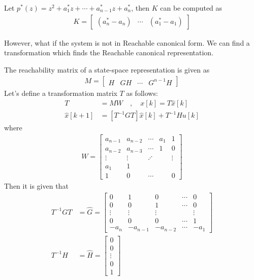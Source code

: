\documentclass[twoside]{article}
\begin{document}
%
Let $p^*(z) = z^2 + a_1^* z + \cdots + a_{n-1}^* z + a_n^*$, then $K$
can be computed as
%
\begin{align*}
  K = \left[ \begin{array}{ccc} (a^*_n - a_n) & \cdots & (a^*_1 - a_1) \end{array} \right]
\end{align*}

However, what if the system is not in Reachable canonical form. We can
find a transformation which finds the Reachable canonical
representation. 

The reachability matrix of a state-space representation is given as
%
\begin{align*}
  M = \left[ \begin{array}{c|c|c|c} H & G H & \cdots & G^{n-1} H\end{array} \right]
\end{align*}
%
Let's define a transformation matrix $T$ as follows:
%
\begin{align*}
  T &= M W \quad , \quad x[k] = T \hat{x}[k]
\\
 \hat{x}[k+1] &= \left[ T^{-1} G T \right] \hat{x}[k] + T^{-1} H u[k]
\end{align*}
%
where
%
\begin{align*}
  W = \left[ \begin{array}{ccccc} a_{n-1} & a_{n-2} & \cdots & a_1 & 1
               \\ 
a_{n-2} & a_{n-3} & \cdots & 1 & 0
\\ \vdots & \vdots & \iddots & & \vdots
\\ a_1 & 1 &  & & 
    \\ 1 & 0 & \cdots &  & 0 \end{array} \right] 
\end{align*}
%
Then it is given that
%
\begin{align*}
  T^{-1} G T &= \hat{G} =  \left[ \begin{array}{ccccc} 0 & 1 & 0 & \cdots & 0 \\ 0 & 0 & 1 &
                                                                      \cdots & 0
\\ \vdots & \vdots & \vdots & & \vdots
\\ 0 & 0 & 0 & \cdots & 1
    \\ -a_n & -a_{n-1} & -a_{n-2} & \cdots & -a_1 \end{array} \right]
\\
  T^{-1} H &= \hat{H} = \left[ \begin{array}{c} 0\\ 0 \\ \vdots \\ 0
    \\ 1 \end{array} \right]
\end{align*}
\end{document}
